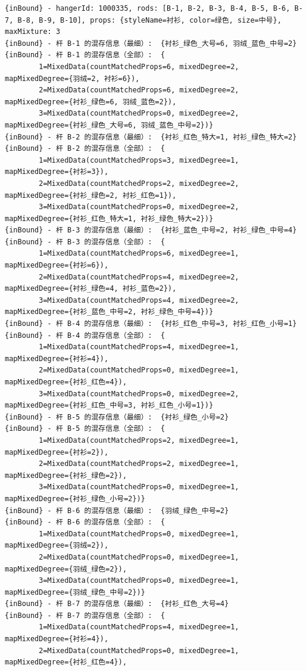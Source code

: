 {\begin{verbatim}
{inBound} - hangerId: 1000335, rods: [B-1, B-2, B-3, B-4, B-5, B-6, B-7, B-8, B-9, B-10], props: {styleName=衬衫, color=绿色, size=中号}, maxMixture: 3
{inBound} - 杆 B-1 的混存信息（最细）:  {衬衫_绿色_大号=6, 羽绒_蓝色_中号=2}
{inBound} - 杆 B-1 的混存信息（全部）:  {
		1=MixedData(countMatchedProps=6, mixedDegree=2, mapMixedDegree={羽绒=2, 衬衫=6}), 
		2=MixedData(countMatchedProps=6, mixedDegree=2, mapMixedDegree={衬衫_绿色=6, 羽绒_蓝色=2}), 
		3=MixedData(countMatchedProps=0, mixedDegree=2, mapMixedDegree={衬衫_绿色_大号=6, 羽绒_蓝色_中号=2})}
{inBound} - 杆 B-2 的混存信息（最细）:  {衬衫_红色_特大=1, 衬衫_绿色_特大=2}
{inBound} - 杆 B-2 的混存信息（全部）:  {
		1=MixedData(countMatchedProps=3, mixedDegree=1, mapMixedDegree={衬衫=3}), 
		2=MixedData(countMatchedProps=2, mixedDegree=2, mapMixedDegree={衬衫_绿色=2, 衬衫_红色=1}), 
		3=MixedData(countMatchedProps=0, mixedDegree=2, mapMixedDegree={衬衫_红色_特大=1, 衬衫_绿色_特大=2})}
{inBound} - 杆 B-3 的混存信息（最细）:  {衬衫_蓝色_中号=2, 衬衫_绿色_中号=4}
{inBound} - 杆 B-3 的混存信息（全部）:  {
		1=MixedData(countMatchedProps=6, mixedDegree=1, mapMixedDegree={衬衫=6}), 
		2=MixedData(countMatchedProps=4, mixedDegree=2, mapMixedDegree={衬衫_绿色=4, 衬衫_蓝色=2}), 
		3=MixedData(countMatchedProps=4, mixedDegree=2, mapMixedDegree={衬衫_蓝色_中号=2, 衬衫_绿色_中号=4})}
{inBound} - 杆 B-4 的混存信息（最细）:  {衬衫_红色_中号=3, 衬衫_红色_小号=1}
{inBound} - 杆 B-4 的混存信息（全部）:  {
		1=MixedData(countMatchedProps=4, mixedDegree=1, mapMixedDegree={衬衫=4}), 
		2=MixedData(countMatchedProps=0, mixedDegree=1, mapMixedDegree={衬衫_红色=4}), 
		3=MixedData(countMatchedProps=0, mixedDegree=2, mapMixedDegree={衬衫_红色_中号=3, 衬衫_红色_小号=1})}
{inBound} - 杆 B-5 的混存信息（最细）:  {衬衫_绿色_小号=2}
{inBound} - 杆 B-5 的混存信息（全部）:  {
		1=MixedData(countMatchedProps=2, mixedDegree=1, mapMixedDegree={衬衫=2}), 
		2=MixedData(countMatchedProps=2, mixedDegree=1, mapMixedDegree={衬衫_绿色=2}), 
		3=MixedData(countMatchedProps=0, mixedDegree=1, mapMixedDegree={衬衫_绿色_小号=2})}
{inBound} - 杆 B-6 的混存信息（最细）:  {羽绒_绿色_中号=2}
{inBound} - 杆 B-6 的混存信息（全部）:  {
		1=MixedData(countMatchedProps=0, mixedDegree=1, mapMixedDegree={羽绒=2}), 
		2=MixedData(countMatchedProps=0, mixedDegree=1, mapMixedDegree={羽绒_绿色=2}), 
		3=MixedData(countMatchedProps=0, mixedDegree=1, mapMixedDegree={羽绒_绿色_中号=2})}
{inBound} - 杆 B-7 的混存信息（最细）:  {衬衫_红色_大号=4}
{inBound} - 杆 B-7 的混存信息（全部）:  {
		1=MixedData(countMatchedProps=4, mixedDegree=1, mapMixedDegree={衬衫=4}), 
		2=MixedData(countMatchedProps=0, mixedDegree=1, mapMixedDegree={衬衫_红色=4}), 

\end{verbatim}}
